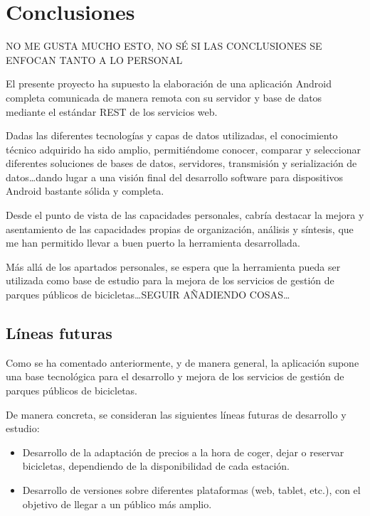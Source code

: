 \chapter{Conclusiones}

NO ME GUSTA MUCHO ESTO, NO SÉ SI LAS CONCLUSIONES SE ENFOCAN TANTO A LO PERSONAL

El presente proyecto ha supuesto la elaboración de una aplicación Android completa comunicada de manera remota con su servidor y base de datos mediante el estándar \textsc{REST} de los servicios web.

Dadas las diferentes tecnologías y capas de datos utilizadas, el conocimiento técnico adquirido ha sido amplio, permitiéndome conocer, comparar y seleccionar diferentes soluciones de bases de datos, servidores, transmisión y serialización de datos\dots dando lugar a una visión final del desarrollo software para dispositivos Android bastante sólida y completa.

Desde el punto de vista de las capacidades personales, cabría destacar la mejora y asentamiento de las capacidades propias de organización, análisis y síntesis, que me han permitido llevar a buen puerto la herramienta desarrollada.

Más allá de los apartados personales, se espera que la herramienta pueda ser utilizada como base de estudio para la mejora de los servicios de gestión de parques públicos de bicicletas\dots SEGUIR AÑADIENDO COSAS\dots




\section{Líneas futuras}

Como se ha comentado anteriormente, y de manera general, la aplicación supone una base tecnológica para el desarrollo y mejora de los servicios de gestión de parques públicos de bicicletas.

De manera concreta, se consideran las siguientes líneas futuras de desarrollo y estudio:

\begin{itemize}  
	\item Desarrollo de la adaptación de precios a la hora de coger, dejar o reservar bicicletas, dependiendo de la disponibilidad de cada estación.
	\item Desarrollo de versiones sobre diferentes plataformas (web, tablet, etc.), con el objetivo de llegar a un público más amplio.
\end{itemize}
